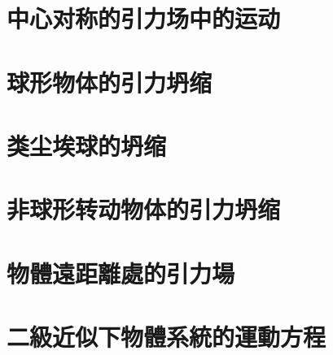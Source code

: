 \section{中心对称的引力场中的运动}

\section{球形物体的引力坍缩}

\section{类尘埃球的坍缩}

\section{非球形转动物体的引力坍缩}


\section{物體遠距離處的引力場}

\section{二級近似下物體系統的運動方程}